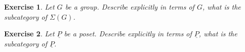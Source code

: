 \documentclass{article}
\newtheorem{exercise}{Exercise}[section]
\begin{document}
    \vspace{0.2in}

    \begin{exercise}


        Let \(G\) be a group.
        Describe explicitly in terms of \(G\), what is the subcategory of \(\Sigma(G)\).

    \end{exercise}

    \begin{exercise}
        Let \(\underline{P}\) be a poset. Describe explicitly in terms of \(\underline{P}\), what is the subcategory of \(\underline{P}\).
    \end{exercise}
\end{document}
